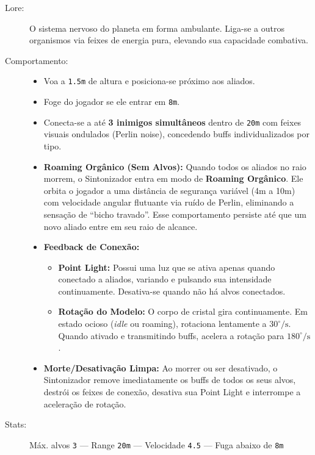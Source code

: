 \documentclass[a4paper,12pt]{report}
\begin{document}
\begin{description}
    \item[Lore:] O sistema nervoso do planeta em forma ambulante. Liga-se a outros organismos via feixes de energia pura, elevando sua capacidade combativa.
    \item[Comportamento:]
    \begin{itemize}
        \item Voa a \texttt{1.5m} de altura e posiciona-se próximo aos aliados.
        \item Foge do jogador se ele entrar em \texttt{8m}.
        \item Conecta-se a até \textbf{3 inimigos simultâneos} dentro de \texttt{20m} com feixes visuais ondulados (Perlin noise), concedendo buffs individualizados por tipo.
        \item \textbf{Roaming Orgânico (Sem Alvos):} Quando todos os aliados no raio morrem, o Sintonizador entra em modo de \textbf{Roaming Orgânico}. Ele orbita o jogador a uma distância de segurança variável (4m a 10m) com velocidade angular flutuante via ruído de Perlin, eliminando a sensação de ``bicho travado''. Esse comportamento persiste até que um novo aliado entre em seu raio de alcance.
        \item \textbf{Feedback de Conexão:}
        \begin{itemize}
            \item \textbf{Point Light:} Possui uma luz que se ativa apenas quando conectado a aliados, variando e pulsando sua intensidade continuamente. Desativa-se quando não há alvos conectados.
            \item \textbf{Rotação do Modelo:} O corpo de cristal gira continuamente. Em estado ocioso (\textit{idle} ou roaming), rotaciona lentamente a $30^\circ/\text{s}$. Quando ativado e transmitindo buffs, acelera a rotação para $180^\circ/\text{s}$.
        \end{itemize}
        \item \textbf{Morte/Desativação Limpa:} Ao morrer ou ser desativado, o Sintonizador remove imediatamente os buffs de todos os seus alvos, destrói os feixes de conexão, desativa sua Point Light e interrompe a aceleração de rotação.
    \end{itemize}
    \item[Stats:] Máx. alvos \texttt{3} --- Range \texttt{20m} --- Velocidade \texttt{4.5} --- Fuga abaixo de \texttt{8m}
\end{description}
\end{document}
